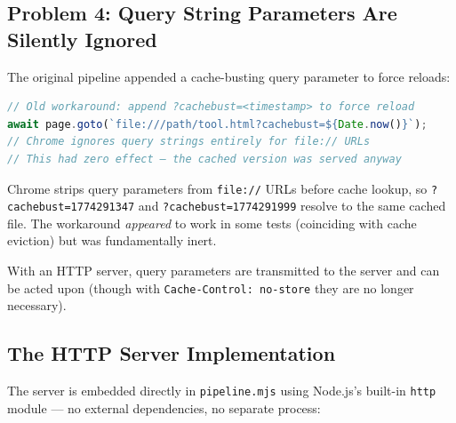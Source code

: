 \documentclass[12pt,a4paper]{article}
\begin{document}
\subsection{Problem 4: Query String Parameters Are Silently Ignored}

The original pipeline appended a cache-busting query parameter to force reloads:

\begin{lstlisting}[language=JavaScript,caption=Cache-busting hack (no longer needed)]
// Old workaround: append ?cachebust=<timestamp> to force reload
await page.goto(`file:///path/tool.html?cachebust=${Date.now()}`);
// Chrome ignores query strings entirely for file:// URLs
// This had zero effect — the cached version was served anyway
\end{lstlisting}

\noindent Chrome strips query parameters from \texttt{file://} URLs before
cache lookup, so \texttt{?cachebust=1774291347} and \texttt{?cachebust=1774291999}
resolve to the same cached file. The workaround \emph{appeared} to work in some
tests (coinciding with cache eviction) but was fundamentally inert.

With an HTTP server, query parameters are transmitted to the server and can be
acted upon (though with \texttt{Cache-Control: no-store} they are no longer
necessary).

\subsection{The HTTP Server Implementation}

The server is embedded directly in \texttt{pipeline.mjs} using Node.js's
built-in \texttt{http} module --- no external dependencies, no separate process:
\end{document}
